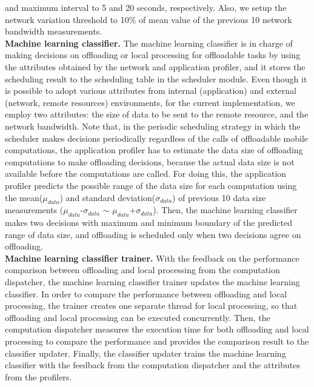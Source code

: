 \documentclass[10pt, conference, compsocconf]{IEEEtran}
\begin{document}
{and maximum interval to 5 and 20 seconds, respectively.
%
Also, we setup the network variation threshold to 10\% of mean value of
the previous 10 network bandwidth measurements.\\
%
\textbf{Machine learning classifier.} The machine learning classifier is
in charge of making decisions on offloading or local processing for
offloadable tasks by using the attributes obtained by
the network and application profiler, and it stores the scheduling
result to the scheduling table in the scheduler module.
%
Even though it is possible to adopt various attributes
from internal (application) and external (network, remote resources)
environments, for the current implementation, we employ two attributes:
the size of data to be sent to the remote resource, and the network
bandwidth.
%
Note that, in the periodic scheduling strategy in which the scheduler
makes decisions periodically regardless of the calls of offloadable
mobile computations, the application profiler has to estimate the data
size of offloading computations to make offloading decisions, because
the actual data size is not available before the computations are
called.
%
For doing this, the application profiler predicts the possible range of
the data size for each computation using the mean($\mu_{data}$)
and standard deviation($\sigma_{data}$) of previous 10 data size
measurements ($\mu_{data}$-$\sigma_{data}$ $\sim$ $\mu_{data}$+$\sigma_{data}$).
%
Then, the machine learning classifier makes two decisions with maximum
and minimum boundary of the predicted range of data size, and offloading
is scheduled only when two decisions agree on offloading.\\ 
%
\textbf{Machine learning classifier trainer.} With the feedback on the
performance comparison between offloading and local processing from the
computation dispatcher, the machine learning classifier trainer updates
the machine learning classifier.
%
In order to compare the performance between offloading and local
processing, the trainer creates one separate thread for local
processing, so that offloading and local processing can be executed
concurrently.
%
Then, the computation dispatcher measures the execution time for both
offloading and local processing to compare the performance and provides
the comparison result to the classifier updater. 
%
Finally, the classifier updater trains the machine learning classifier 
with the feedback from the computation dispatcher and the attributes
from the profilers.
%
%
\begin{figure}

\end{figure}}
\end{document}
